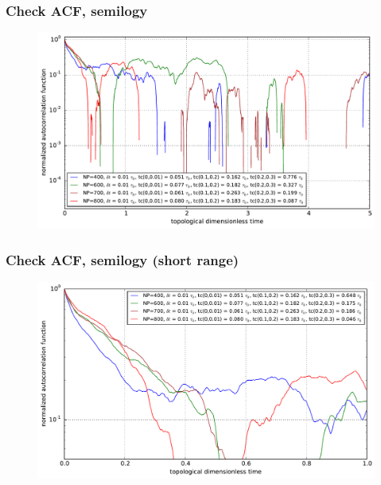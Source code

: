 \documentclass[slidestop, compress, mathserif]{beamer}
\begin{document}
\begin{frame}
  \frametitle<presentation>{Check ACF, semilogy}
  \begin{figure}
    \centering
    \includegraphics[width=\textwidth]{../check_ACF_initial_semilogy.pdf}
  \end{figure}
\end{frame}

\begin{frame}
  \frametitle<presentation>{Check ACF, semilogy (short range)}
  \begin{figure}
    \centering
    \includegraphics[width=\textwidth]{../check_ACF_initial_semilogy_detail.pdf}
  \end{figure}
\end{frame}
\end{document}

